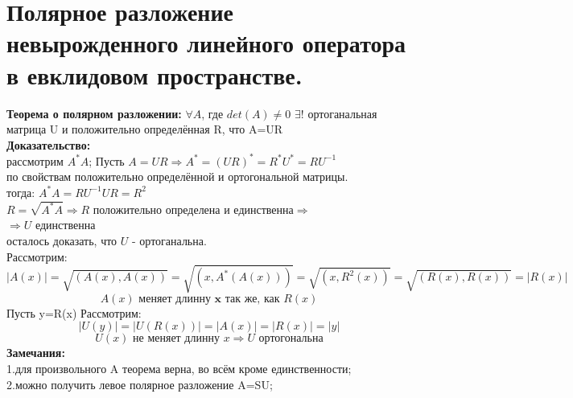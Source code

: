 \documentclass[12pt]{article}
\begin{document}
\section{Полярное разложение невырожденного линейного оператора в евклидовом пространстве.}
\textbf{Теорема о полярном разложении:}
\( \forall A\), где \( det(A)\ne0\) \(\exists!\) ортоганальная матрица U и положительно определённая R, что A=UR\\
\textbf{Доказательство:}\\
рассмотрим \(A^*A\); Пусть \(A=UR\Rightarrow A^*=(UR)^*=R^*U^*=RU^{-1}\)\\ по свойствам положительно определённой и ортогональной матрицы.\\
тогда:
\(A^*A=RU^{-1}UR=R^2\)\\
\(R=\sqrt{A^*A} \Rightarrow R\) положительно определена и единственна\(\Rightarrow\)\\
\(\Rightarrow U\) единственна\\
осталось доказать, что \(U\) - ортоганальна.\\
Рассмотрим: \\
\[
|A(x)|=\sqrt{(A(x),A(x))}=\sqrt{(x,A^*(A(x)))}=\sqrt{(x,R^2(x))}=\sqrt{(R(x),R(x))}=|R(x)|
\]
\[
A(x) \textbf{ меняет длинну x так же, как }R(x)
\]
Пусть y=R(x)
Рассмотрим: \\
\[
|U(y)|=|U(R(x))|=|A(x)|=|R(x)|=|y|
\]
\[
U(x)\textbf{ не меняет длинну } x \Rightarrow U \textbf{ ортогональна}
\]
\textbf{Замечания:}\\
1.для произвольного A теорема верна, во всём кроме единственности;\\
2.можно получить левое полярное разложение A=SU;
\end{document}
